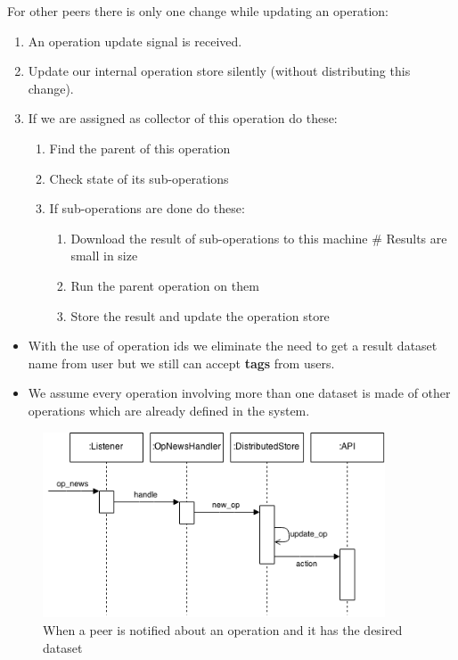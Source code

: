 For other peers there is only one change while updating an operation:
\begin{enumerate}
\item An operation update signal is received.
\item Update our internal operation store silently (without distributing this change).
\item If we are assigned as collector of this operation do these:
  \begin{enumerate}
  \item Find the parent of this operation
  \item Check state of its sub-operations
  \item If sub-operations are done do these:
    \begin{enumerate}
    \item Download the result of sub-operations to this machine \# Results are small in size
    \item Run the parent operation on them
    \item Store the result and update the operation store
    \end{enumerate}
  \end{enumerate}
\end{enumerate}

\begin{itemize}
\item With the use of operation ids we eliminate the need to get a 
result dataset name from user but we still can accept \textbf{tags} from users.
\end{itemize}

\begin{itemize}
\item We assume every operation involving more than one dataset is made of
other operations which are already defined in the system.
\end{itemize}

\begin{figure}[h]
  \centering
  \includegraphics[width=4in]{poster/figures/kseq2.png}
  \caption[Sequence diagram showing arrival of an operation message]
   {When a peer is notified about an operation and it has the desired dataset}
\end{figure}

